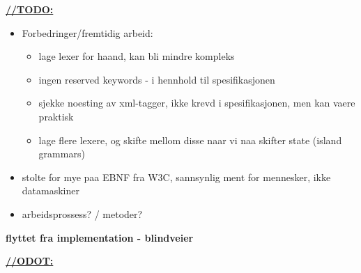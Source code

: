 \label{sect:summary:future_work}
\underline{\textbf{\LARGE //TODO:}}
\begin{itemize}
	\item Forbedringer/fremtidig arbeid:
	\begin{itemize}
		\item lage lexer for haand, kan bli mindre kompleks
		\item ingen reserved keywords - i hennhold til spesifikasjonen
		\item sjekke noesting av xml-tagger, ikke krevd i spesifikasjonen, men kan vaere praktisk
		\item lage flere lexere, og skifte mellom disse naar vi naa skifter state
		(island grammars)
	\end{itemize}
	
	\item stolte for mye paa EBNF fra W3C, sannsynlig ment for mennesker, ikke
	datamaskiner
	\item arbeidsprossess? / metoder?
\end{itemize}


\textbf{\LARGE flyttet fra implementation - blindveier}


\underline{\textbf{\LARGE //ODOT:}}